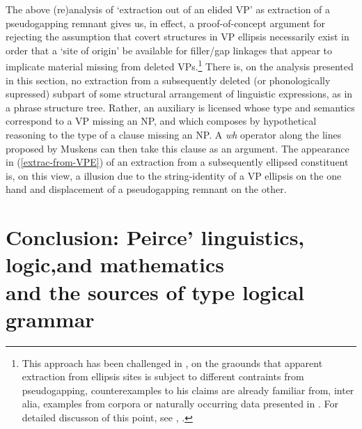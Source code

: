\documentclass[output=paper,colorlinks,citecolor=brown]{langscibook}
\begin{document}
The above (re)analysis of `extraction out of an elided VP' as
extraction of a pseudogapping remnant gives us, in effect, a
proof-of-concept argument for rejecting the assumption that covert
structures in VP ellipsis necessarily exist in order that a `site of
origin' be available for filler/gap linkages that appear to implicate
material missing from deleted VPs.\footnote{This approach has been
challenged in \citet{johnson2001}, on the graounds that apparent extraction
from ellipsis sites is subject to different contraints from
pseudogapping, counterexamples to his claims are already familiar
from, inter alia, examples from corpora or naturally occurring data
presented in \citet{levin-diss}. For detailed discusson of this point, see
\citet{kubotalevineBook}, .} There is, on the analysis
presented in this section, no extraction from a subsequently deleted
(or phonologically supressed) subpart of some structural arrangement
of linguistic expressions, as in a phrase structure tree. Rather, an
auxiliary is licensed whose type and semantics correspond to a VP
missing an NP, and which composes by hypothetical reasoning to the
type of a clause missing an NP. A \textit{wh} operator along the lines
proposed by Muskens can then take this clause as an argument. The
appearance in (\ref{extrac-from-VPE}) of an extraction from a subsequently
ellipsed constituent is, on this view, a illusion due to the
string-identity of a VP ellipsis on the one hand and displacement of a
pseudogapping remnant on the other.

\section{Conclusion: Peirce' linguistics, logic,and mathematics\\ and the sources of type logical grammar}
\end{document}
